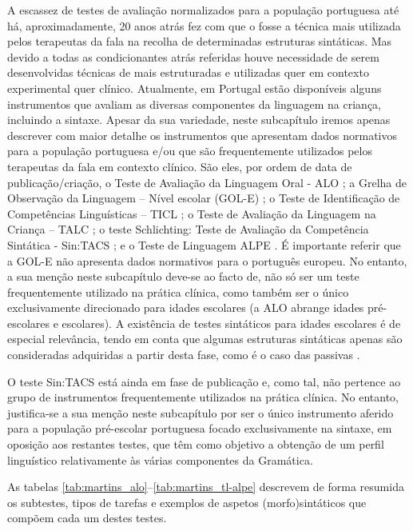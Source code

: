 \documentclass[output=paper]{LSP/langsci}
\begin{document}
A escassez de testes de avaliação normalizados para a população portuguesa até há, aproximadamente, 20 anos atrás fez com que o  fosse a técnica mais utilizada pelos terapeutas da fala na recolha de determinadas estruturas sintáticas. Mas devido a todas as condicionantes atrás referidas houve necessidade de serem desenvolvidas técnicas de  mais estruturadas e utilizadas quer em contexto experimental quer clínico. Atualmente, em Portugal estão disponíveis alguns instrumentos que avaliam as diversas componentes da linguagem na criança, incluindo a sintaxe. Apesar da sua variedade, neste subcapítulo iremos apenas descrever com maior detalhe os instrumentos que apresentam dados normativos para a população portuguesa e/ou que são frequentemente utilizados pelos terapeutas da fala em contexto clínico. São eles, por ordem de data de publicação/criação, o Teste de Avaliação da Linguagem Oral - ALO \citep{simsim1997}; a Grelha de Observação da Linguagem – Nível escolar (GOL-E) \citep{suakaysantos2003}; o Teste de Identificação de Competências Linguísticas – TICL \citep{viana2004}; o Teste de Avaliação da Linguagem na Criança – TALC \citep{suakaytavares2006}; o teste Schlichting: Teste de Avaliação da Competência Sintática - Sin:TACS \citep{vieir2011}; e o Teste de Linguagem ALPE \citep{mendes_etal2014}. É importante referir que a GOL-E não apresenta dados normativos para o português europeu. No entanto, a sua menção neste subcapítulo deve-se ao facto de, não só ser um teste frequentemente utilizado na prática clínica, como também ser o único exclusivamente direcionado para idades escolares (a ALO abrange idades pré-escolares e escolares). A existência de testes sintáticos para idades escolares é de especial relevância, tendo em conta que algumas estruturas sintáticas apenas são consideradas adquiridas a partir desta fase, como é o caso das passivas \citep{simsim1997}.

O teste Sin:TACS está ainda em fase de publicação e, como tal, não pertence ao grupo de instrumentos frequentemente utilizados na prática clínica. No entanto, justifica-se a sua menção neste subcapítulo por ser o único instrumento aferido para a população pré-escolar portuguesa focado exclusivamente na sintaxe, em oposição aos restantes testes, que têm como objetivo a obtenção de um perfil linguístico relativamente às várias componentes da Gramática. 

As tabelas \ref{tab:martins_alo}--\ref{tab:martins_tl-alpe} descrevem de forma resumida os subtestes, tipos de tarefas e exemplos de aspetos (morfo)sintáticos que compõem cada um destes testes.
\end{document}
